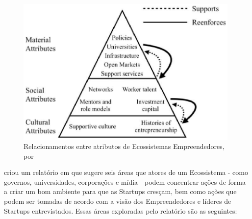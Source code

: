 \begin{figure}[!htb]
\centering
\includegraphics[width=11cm,angle=0]{figuras/relationship_among_ecosystems_attributes}
\caption{Relacionamentos entre atributos de Ecossistemas Empreendedores, por }
\label{figure:relationship_among_ecosystems_attributes}
\end{figure}

 criou um relatório em que sugere seis áreas que atores de um Ecossistema - como governos, universidades, corporações e mídia - podem concentrar ações de forma a criar um bom ambiente para que as Startups cresçam, bem como ações que podem ser tomadas de acordo com a visão dos Empreendedores e líderes de Startups entrevistados. Essas áreas exploradas pelo relatório são as seguintes:

